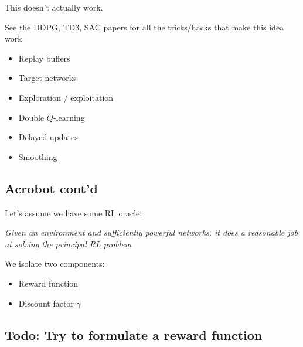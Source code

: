 \documentclass[
  letterpaper,
  DIV=11,
  numbers=noendperiod,
  oneside]{scrartcl}
\providecommand{\tightlist}{%
  \setlength{\itemsep}{0pt}\setlength{\parskip}{0pt}}\usepackage{longtable,booktabs,array}
\begin{document}
This doesn't actually work.

See the DDPG, TD3, SAC papers for all the tricks/hacks that make this
idea work.

\begin{itemize}
\tightlist
\item
  Replay buffers
\item
  Target networks
\item
  Exploration / exploitation
\end{itemize}

\begin{itemize}
\tightlist
\item
  Double \(Q\)-learning
\item
  Delayed updates
\item
  Smoothing
\end{itemize}


\subsection{Acrobot cont'd}\label{acrobot-contd}

Let's assume we have some RL oracle:

\emph{Given an environment and sufficiently powerful networks, it does a
reasonable job at solving the principal RL problem}

We isolate two components:

\begin{itemize}
\tightlist
\item
  Reward function
\item
  Discount factor \(\gamma\)
\end{itemize}

\subsection{Todo: Try to formulate a reward
function}\label{todo-try-to-formulate-a-reward-function}
\end{document}
